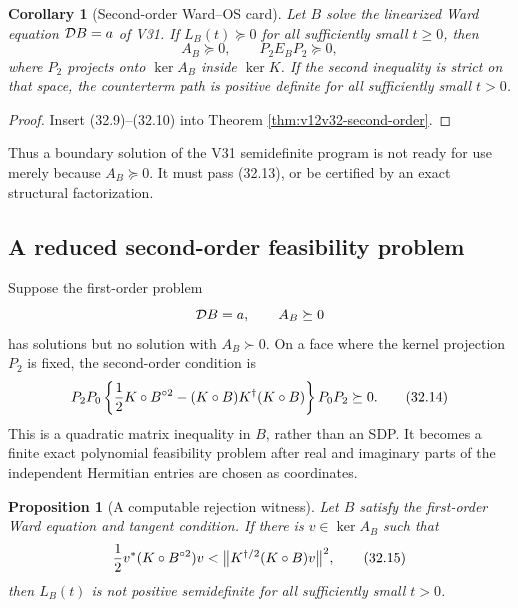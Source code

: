 \documentclass[11pt]{article}
\newtheorem{proposition}[theorem]{Proposition}
\newtheorem{corollary}[theorem]{Corollary}
\theoremstyle{remark}
\begin{document}
\begin{corollary}[Second-order Ward--OS card]
\label{cor:v12v32-Ward-OS}
Let \(B\) solve the linearized Ward equation
\({\cal D}B=a\) of V31.  If \(L_B(t)\succeq0\) for all sufficiently
small \(t\geq0\), then
\begin{equation}
 A_B\succeq0,\qquad
 P_2E_BP_2\succeq0,                              \tag{32.13}
\end{equation}
where \(P_2\) projects onto \(\ker A_B\) inside \(\ker K\).
If the second inequality is strict on that space, the counterterm
path is positive definite for all sufficiently small \(t>0\).
\end{corollary}

\begin{proof}
Insert (32.9)--(32.10) into Theorem
\ref{thm:v12v32-second-order}.
\end{proof}

Thus a boundary solution of the V31 semidefinite program is not ready
for use merely because \(A_B\succeq0\).  It must pass (32.13), or be
certified by an exact structural factorization.

\subsection{A reduced second-order feasibility problem}

Suppose the first-order problem
\[
 {\cal D}B=a,\qquad A_B\succeq0
\]
has solutions but no solution with \(A_B\succ0\).  On a face where
the kernel projection \(P_2\) is fixed, the second-order condition is
\begin{equation}
 P_2P_0\left\{
 {1\over2}K\circ B^{\circ2}
 -(K\circ B)K^\dagger(K\circ B)
 \right\}P_0P_2\succeq0.                         \tag{32.14}
\end{equation}
This is a quadratic matrix inequality in \(B\), rather than an SDP.
It becomes a finite exact polynomial feasibility problem after real
and imaginary parts of the independent Hermitian entries are chosen
as coordinates.

\begin{proposition}[A computable rejection witness]
\label{prop:v12v32-rejection}
Let \(B\) satisfy the first-order Ward equation and tangent condition.
If there is \(v\in\ker A_B\) such that
\begin{equation}
 {1\over2}v^*(K\circ B^{\circ2})v
 <
 \bigl\|K^{\dagger/2}(K\circ B)v\bigr\|^2,        \tag{32.15}
\end{equation}
then \(L_B(t)\) is not positive semidefinite for all sufficiently
small \(t>0\).
\end{proposition}
\end{document}
